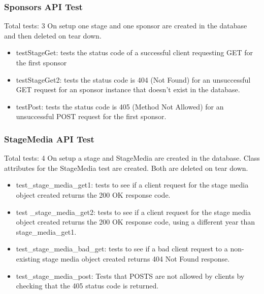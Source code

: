 \documentclass[12pt,english]{scrartcl}
\begin{document}
\subsubsection{Sponsors API Test} 
Total tests: 3
On setup one stage and one sponsor are created in the database and then deleted on tear down.
\begin{itemize}
 \item testStageGet: tests the status code of a successful client requesting GET for the first sponsor
 
 \item testStageGet2: tests the status code is 404 (Not Found) for an unsuccessful GET request for an sponsor instance
 that doesn't exist in the database.
 
 \item testPost: tests the status code is 405 (Method Not Allowed) for an unsuccessful POST request for the first sponsor.
\end{itemize}

\subsubsection{StageMedia API Test} 
Total tests: 4
On setup a stage and StageMedia are created in the database. Class attributes for the StageMedia test are created.
Both are deleted on tear down.
\begin{itemize}
 \item test\_stage\_media\_get1: tests to see if a client request for the stage media object created returns the 200 OK response code.
 
 \item test \_stage\_media\_get2: tests to see if a client request for the stage media object created returns the 200 OK response code, using a different year than stage_media_get1.
 
 \item test\_stage\_media\_bad\_get: tests to see if a bad client request to a non-existing stage media object created returns 
                                     404 Not Found response.
 
 \item test\_stage\_media\_post: Tests that POSTS are not allowed by clients by checking that the 405 status code is returned.
\end{itemize}
\end{document}
